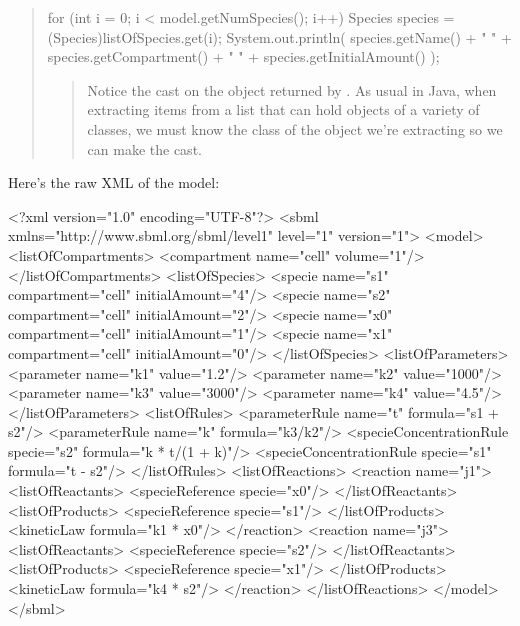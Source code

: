 \documentclass{sbmlmanual}
\begin{document}
\begin{quotation}
\begin{javaVerbatimNoIndent}
for (int i = 0; i < model.getNumSpecies(); i++) {
   Species species = (Species)listOfSpecies.get(i);
   System.out.println(
      species.getName() + "  " +
      species.getCompartment() + "  " +
      species.getInitialAmount()
   );
}
\end{javaVerbatimNoIndent}

\begin{quote}
   Notice the  cast on the object returned by
   .  As usual in Java, when extracting
   items from a list that can hold objects of a variety of
   classes, we must know the class of the object we're
   extracting so we can make the cast.
\end{quote}

\end{quotation}

Here's the raw XML of the model:

\begin{boxedCodeVerbatim}
<?xml version="1.0" encoding="UTF-8"?>
<sbml xmlns="http://www.sbml.org/sbml/level1" level="1" version="1">
  <model>
    <listOfCompartments>
      <compartment name="cell" volume="1"/>
    </listOfCompartments>
    <listOfSpecies>
      <specie name="s1" compartment="cell" initialAmount="4"/>
      <specie name="s2" compartment="cell" initialAmount="2"/>
      <specie name="x0" compartment="cell" initialAmount="1"/>
      <specie name="x1" compartment="cell" initialAmount="0"/>
    </listOfSpecies>
    <listOfParameters>
      <parameter name="k1" value="1.2"/>
      <parameter name="k2" value="1000"/>
      <parameter name="k3" value="3000"/>
      <parameter name="k4" value="4.5"/>
    </listOfParameters>
    <listOfRules>
      <parameterRule name="t" formula="s1 + s2"/>
      <parameterRule name="k" formula="k3/k2"/>
      <specieConcentrationRule specie="s2" formula="k * t/(1 + k)"/>
      <specieConcentrationRule specie="s1" formula="t - s2"/>
    </listOfRules>
    <listOfReactions>
      <reaction name="j1">
        <listOfReactants>
          <specieReference specie="x0"/>
        </listOfReactants>
        <listOfProducts>
          <specieReference specie="s1"/>
        </listOfProducts>
        <kineticLaw formula="k1 * x0"/>
      </reaction>
      <reaction name="j3">
        <listOfReactants>
          <specieReference specie="s2"/>
        </listOfReactants>
        <listOfProducts>
          <specieReference specie="x1"/>
        </listOfProducts>
        <kineticLaw formula="k4 * s2"/>
      </reaction>
    </listOfReactions>
  </model>
</sbml>
\end{boxedCodeVerbatim}
\end{document}
